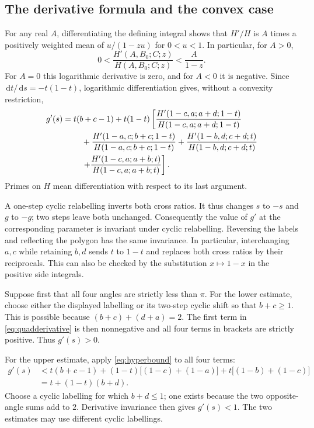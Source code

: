 \documentclass[11pt,a4paper]{article}
\newcommand{\dd}{\,\mathrm d}
\theoremstyle{definition}
\theoremstyle{remark}
\numberwithin{equation}{section}
\begin{document}
\subsection{The derivative formula and the convex case}
For any real $A$, differentiating the defining integral shows that $H'/H$ is $A$ times a positively weighted mean of $u/(1-zu)$ for $0<u<1$. In particular, for $A>0$,
\begin{equation}\label{eq:hyperbound}
0<\frac{H'(A,B_0;C;z)}{H(A,B_0;C;z)}<\frac{A}{1-z}.
\end{equation}
For $A=0$ this logarithmic derivative is zero, and for $A<0$ it is negative. Since $\dd t/\dd s=-t(1-t)$, logarithmic differentiation gives, without a convexity restriction,
\begin{align}
g'(s)={}&t(b+c-1)+t(1-t)\left[
\frac{H'(1-c,a;a+d;1-t)}{H(1-c,a;a+d;1-t)}\right.\notag\\
&\quad+\frac{H'(1-a,c;b+c;1-t)}{H(1-a,c;b+c;1-t)}
+\frac{H'(1-b,d;c+d;t)}{H(1-b,d;c+d;t)}\notag\\
&\left.\quad+\frac{H'(1-c,a;a+b;t)}{H(1-c,a;a+b;t)}\right].\label{eq:quadderivative}
\end{align}
Primes on $H$ mean differentiation with respect to its last argument.

A one-step cyclic relabelling inverts both cross ratios. It thus changes $s$ to $-s$ and $g$ to $-g$; two steps leave both unchanged. Consequently the value of $g'$ at the corresponding parameter is invariant under cyclic relabelling. Reversing the labels and reflecting the polygon has the same invariance. In particular, interchanging $a,c$ while retaining $b,d$ sends $t$ to $1-t$ and replaces both cross ratios by their reciprocals. This can also be checked by the substitution $x\mapsto1-x$ in the positive side integrals.

Suppose first that all four angles are strictly less than $\pi$. For the lower estimate, choose either the displayed labelling or its two-step cyclic shift so that $b+c\ge1$. This is possible because $(b+c)+(d+a)=2$. The first term in \eqref{eq:quadderivative} is then nonnegative and all four terms in brackets are strictly positive. Thus $g'(s)>0$.

For the upper estimate, apply \eqref{eq:hyperbound} to all four terms:
\begin{align*}
g'(s)&<t(b+c-1)
+(1-t)\bigl[(1-c)+(1-a)\bigr]
+t\bigl[(1-b)+(1-c)\bigr]\\
&=t+(1-t)(b+d).
\end{align*}
Choose a cyclic labelling for which $b+d\le1$; one exists because the two opposite-angle sums add to $2$. Derivative invariance then gives $g'(s)<1$. The two estimates may use different cyclic labellings.
\end{document}
